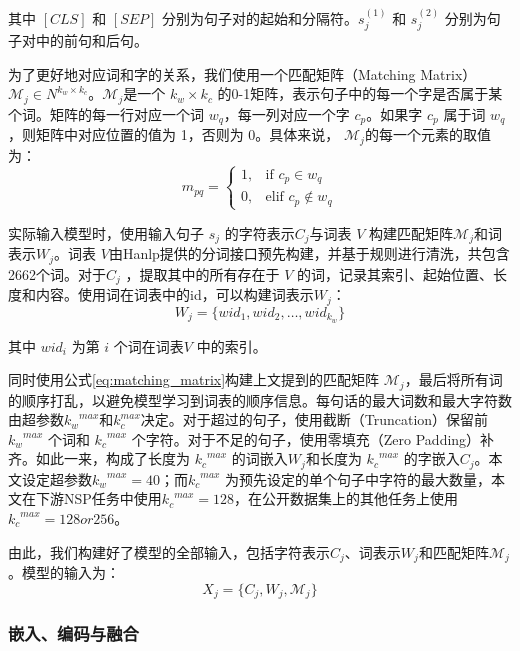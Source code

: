 \documentclass[12pt, a4paper]{ctexart}
\begin{document}
其中 $[CLS]$ 和 $[SEP]$ 分别为句子对的起始和分隔符。$s_j^{(1)}$ 和 $s_j^{(2)}$ 分别为句子对中的前句和后句。

为了更好地对应词和字的关系，我们使用一个匹配矩阵（Matching Matrix）${\mathcal{M}}_j  \in N^{k_w \times k_c}$。${\mathcal{M}}_j$是一个 $k_w \times k_c$ 的0-1矩阵，表示句子中的每一个字是否属于某个词。矩阵的每一行对应一个词 $w_q$，每一列对应一个字 $c_p$。如果字 $c_p$ 属于词 $w_q$，则矩阵中对应位置的值为 1，否则为 0。具体来说，
$ {\mathcal{M}}_j$的每一个元素的取值为：
\begin{equation}
    m_{pq} = \begin{cases}
        1, & \text{if } c_p \in w_q \\
        0, & \text{elif } c_p \notin w_q
    \end{cases}
    \label{eq:matching_matrix}
\end{equation}

实际输入模型时，使用输入句子 $s_j$ 的字符表示$C_j$与词表 $V$ 构建匹配矩阵${\mathcal{M}}_j$和词表示$W_j$。词表 $V$由Hanlp提供的分词接口预先构建，并基于规则进行清洗，共包含2662个词。对于$C_j$ ，提取其中的所有存在于 $V$ 的词，记录其索引、起始位置、长度和内容。使用词在词表中的id，可以构建词表示$W_j$：
\begin{equation}
    W_j = \{wid_1, wid_2, \dots, wid_{k_w}\}
\end{equation}

其中 $wid_i$ 为第 $i$ 个词在词表$V$ 中的索引。

同时使用公式\ref{eq:matching_matrix}构建上文提到的匹配矩阵 ${\mathcal{M}}_j$，最后将所有词的顺序打乱，以避免模型学习到词表的顺序信息。每句话的最大词数和最大字符数由超参数${k_w}^{max}$和${k_c^{max}}$决定。对于超过的句子，使用截断（Truncation）保留前 ${k_w}^{max}$ 个词和 ${k_c}^{max}$ 个字符。对于不足的句子，使用零填充（Zero Padding）补齐。如此一来，构成了长度为 ${k_c}^{max}$ 的词嵌入$W_j$和长度为 ${k_c}^{max}$ 的字嵌入$C_j$。本文设定超参数${k_w}^{max}=40$；而${k_c}^{max}$ 为预先设定的单个句子中字符的最大数量，本文在下游NSP任务中使用${k_c}^{max}=128$，在公开数据集上的其他任务上使用${k_c}^{max}=128 or 256$。

由此，我们构建好了模型的全部输入，包括字符表示$C_j$、词表示$W_j$和匹配矩阵${\mathcal{M}}_j$。模型的输入为：
\begin{equation}
        X_j = \{C_j, W_j, {\mathcal{M}}_j\}
\end{equation}

\subsubsection{嵌入、编码与融合}
\end{document}
